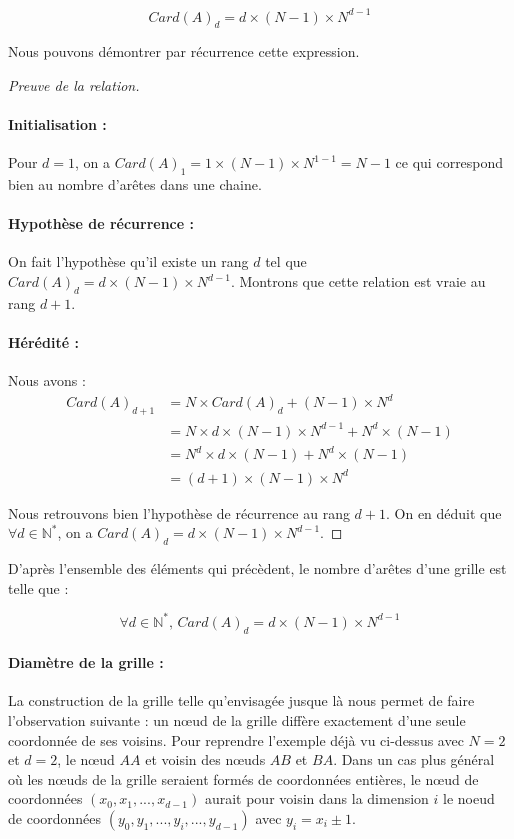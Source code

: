 $$Card(A)_d = d\times (N-1)\times N^{d-1}$$

Nous pouvons démontrer par récurrence cette expression.

\begin{proof}[Preuve de la relation]
\item
\paragraph{Initialisation :} 
Pour $d=1$, on a $Card(A)_1 = 1\times (N-1)\times N^{1-1} = N-1$ ce qui correspond bien au nombre d'arêtes dans une chaine.

\paragraph{Hypothèse de récurrence :}
On fait l'hypothèse qu'il existe un rang $d$ tel que $Card(A)_d = d\times (N-1)\times N^{d-1}$. Montrons que cette relation est vraie au rang $d+1$.

\paragraph{Hérédité :} Nous avons :
\begin{align*}
Card(A)_{d+1} & = N \times Card(A)_d + (N-1)\times N^d \\
& = N\times d\times (N-1)\times N^{d-1} + N^d\times (N-1)\\
& = N^d\times d\times (N-1) + N^d\times (N-1)\\
& = (d+1)\times (N-1)\times N^d
\end{align*}

Nous retrouvons bien l'hypothèse de récurrence au rang $d+1$. On en déduit que $\forall d \in \mathbb{N^*}$, on a $Card(A)_d = d\times (N-1)\times N^{d-1}$.
\end{proof}

D'après l'ensemble des éléments qui précèdent, le nombre d'arêtes d'une grille est telle que :

$$\forall d \in \mathbb{N^*} \text{, }Card(A)_d = d\times (N-1)\times N^{d-1} $$ 



\paragraph{Diamètre de la grille :}

La construction de la grille telle qu'envisagée jusque là nous permet de faire l'observation suivante : un nœud de la grille diffère exactement d'une seule coordonnée de ses voisins. Pour reprendre l'exemple déjà vu ci-dessus avec $N=2$ et $d=2$, le nœud $AA$ et voisin des nœuds $AB$ et $BA$. Dans un cas plus général où les nœuds de la grille seraient formés de coordonnées entières, le nœud de coordonnées $(x_0,x_1, ..., x_{d-1})$ aurait pour voisin dans la dimension $i$ le noeud de coordonnées $(y_0,y_1,...,y_i,...,y_{d-1})$ avec $y_i=x_i\pm1$.

